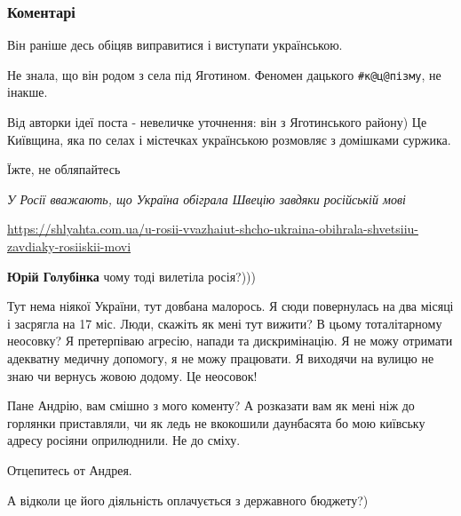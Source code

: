  
 
 
 
 
\subsubsection{Коментарі}

\begin{itemize}
Він раніше десь обіцяв виправитися і виступати українською.

Не знала, що він родом з села під Яготином. Феномен дацького \verb|#к@ц@пізму|, не інакше.

Від авторки ідеї поста - невеличке уточнення: він з Яготинського району) Це
Київщина, яка по селах і містечках українською розмовляє з домішками суржика.

Їжте, не обляпайтесь\par
{\em У Росії вважають, що Україна обіграла Швецію завдяки російській мові}\par
\url{https://shlyahta.com.ua/u-rosii-vvazhaiut-shcho-ukraina-obihrala-shvetsiiu-zavdiaky-rosiiskii-movi}

\textbf{Юрій Голубінка} чому тоді вилетіла росія?)))


Тут нема ніякої України, тут довбана малорось. Я сюди повернулась на два місяці
і засрягла на 17 міс. Люди, скажіть як мені тут вижити? В цьому тоталітарному
неосовку? Я претерпіваю агресію, напади та дискримінацію. Я не можу отримати
адекватну медичну допомогу, я не можу працювати. Я виходячи на вулицю не знаю
чи вернусь жовою додому. Це неосовок!


Пане Андрію, вам смішно з мого коменту? А розказати вам як мені ніж до горлянки
приставляли, чи як ледь не вкокошили даунбасята бо мою київську адресу росіяни
оприлюднили. Не до сміху.

Отцепитесь от Андрея.

А відколи це його діяльність оплачується з державного бюджету?)


\end{itemize}
